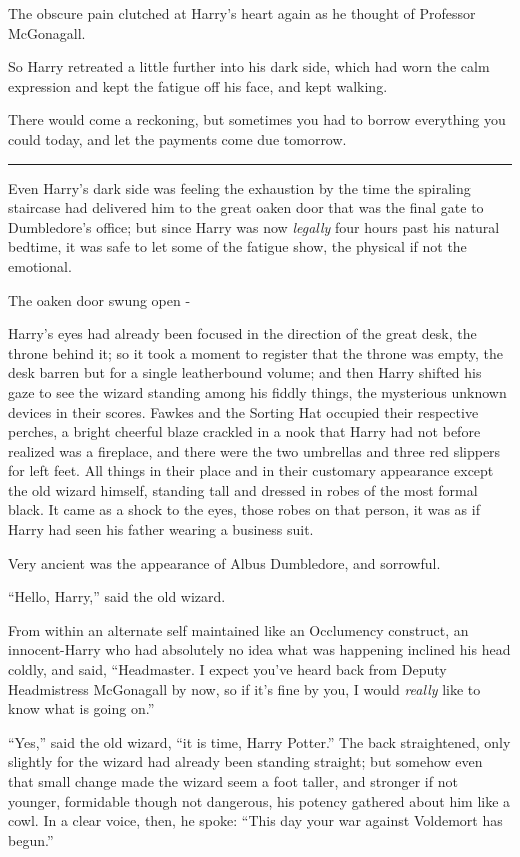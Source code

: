 The obscure pain clutched at Harry's heart again as he thought of Professor McGonagall.

So Harry retreated a little further into his dark side, which had worn the calm expression and kept the fatigue off his face, and kept walking.

There would come a reckoning, but sometimes you had to borrow everything you could today, and let the payments come due tomorrow.

\begin{center}\rule{3in}{0.4pt}\end{center}

Even Harry's dark side was feeling the exhaustion by the time the spiraling staircase had delivered him to the great oaken door that was the final gate to Dumbledore's office; but since Harry was now \emph{legally} four hours past his natural bedtime, it was safe to let some of the fatigue show, the physical if not the emotional.

The oaken door swung open -

Harry's eyes had already been focused in the direction of the great desk, the throne behind it; so it took a moment to register that the throne was empty, the desk barren but for a single leatherbound volume; and then Harry shifted his gaze to see the wizard standing among his fiddly things, the mysterious unknown devices in their scores. Fawkes and the Sorting Hat occupied their respective perches, a bright cheerful blaze crackled in a nook that Harry had not before realized was a fireplace, and there were the two umbrellas and three red slippers for left feet. All things in their place and in their customary appearance except the old wizard himself, standing tall and dressed in robes of the most formal black. It came as a shock to the eyes, those robes on that person, it was as if Harry had seen his father wearing a business suit.

Very ancient was the appearance of Albus Dumbledore, and sorrowful.

``Hello, Harry,'' said the old wizard.

From within an alternate self maintained like an Occlumency construct, an innocent-Harry who had absolutely no idea what was happening inclined his head coldly, and said, ``Headmaster. I expect you've heard back from Deputy Headmistress McGonagall by now, so if it's fine by you, I would \emph{really} like to know what is going on.''

``Yes,'' said the old wizard, ``it is time, Harry Potter.'' The back straightened, only slightly for the wizard had already been standing straight; but somehow even that small change made the wizard seem a foot taller, and stronger if not younger, formidable though not dangerous, his potency gathered about him like a cowl. In a clear voice, then, he spoke: ``This day your war against Voldemort has begun.''

